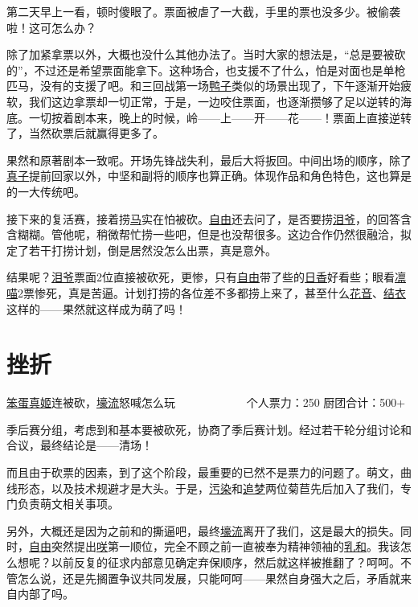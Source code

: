 第二天早上一看，顿时傻眼了。票面被虐了一大截，手里的票也没多少。被偷袭啦！这可怎么办？

除了加紧拿票以外，大概也没什么其他办法了。当时大家的想法是，“总是要被砍的”，不过还是希望票面能拿下。这种场合，也支援不了什么，怕是对面也是单枪匹马，没有的支援了吧。和三回战第一场\uline{鸭子}类似的场景出现了，下午逐渐开始疲软，我们这边拿票却一切正常，于是，一边咬住票面，也逐渐攒够了足以逆转的海底。一切按着剧本来，晚上的时候，岭——上——开——花——！票面上直接逆转了，当然砍票后就赢得更多了。

果然和原著剧本一致呢。开场先锋战失利，最后大将扳回。中间出场的顺序，除了\uline{真子}提前回家以外，中坚和副将的顺序也算正确。体现作品和角色特色，这也算是的一大传统吧。

接下来的复活赛，接着捞\uline{马}实在怕被砍。\uline{自由}还去问了，是否要捞\uline{\uline{泪爷}}，的回答含含糊糊。管他呢，稍微帮忙捞一些吧，但是也没帮很多。这边合作仍然很融洽，拟定了若干打捞计划，倒是居然没怎么出票，真是意外。

结果呢？\uline{泪爷}票面2位直接被砍死，更惨，只有\uline{自由}带了些的\uline{日香}好看些；眼看\uline{凛喵}2票惨死，真是苦逼。计划打捞的各位差不多都捞上来了，甚至什么\uline{花音}、\uline{结衣}这样的——果然就这样成为萌了吗！

\chapter{挫折}
\begin{center}
{\subTitle \uline{笨蛋}\uline{真姬}连被砍，\uline{壕流}怒喊怎么玩}
\subMemo
　　　　　　个人票力：250 厨团合计：500+
\end{center}

季后赛分组，考虑到和基本要被砍死，协商了季后赛计划。经过若干轮分组讨论和合议，最终结论是——清场！

而且由于砍票的因素，到了这个阶段，最重要的已然不是票力的问题了。萌文，曲线形态，以及技术规避才是大头。于是，\uline{污染}和\uline{追梦}两位菊苣先后加入了我们，专门负责萌文相关事项。

另外，大概还是因为之前和的撕逼吧，最终\uline{壕流}离开了我们，这是最大的损失。同时，\uline{自由}突然提出\uline{咲}第一顺位，完全不顾之前一直被奉为精神领袖的\uline{乳和}。我该怎么想呢？以前反复的征求内部意见确定弃保顺序，然后就这样被推翻了？呵呵。不管怎么说，还是先搁置争议共同发展，只能呵呵——果然自身强大之后，矛盾就来自内部了吗。


